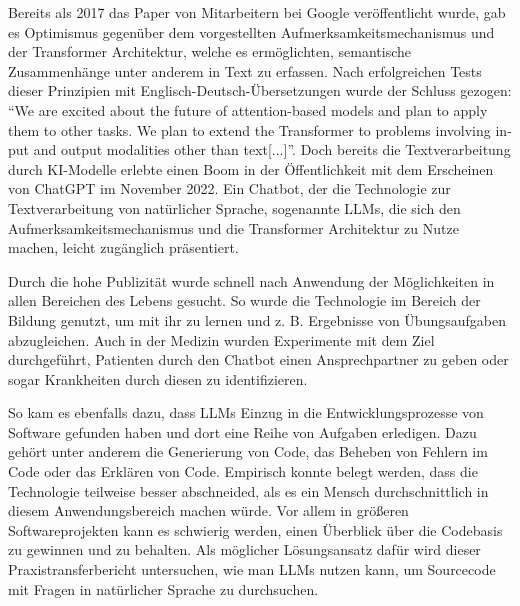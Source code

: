 \documentclass[../main.tex]{subfiles}
\begin{document}
Bereits als 2017 das Paper  von Mitarbeitern bei Google veröffentlicht wurde, gab es Optimismus gegenüber dem vorgestellten Aufmerksamkeitsmechanismus und der Transformer Architektur, welche es ermöglichten, semantische Zusammenhänge unter anderem in Text zu erfassen.
Nach erfolgreichen Tests dieser Prinzipien mit Englisch-Deutsch-Übersetzungen wurde der Schluss gezogen: \foreignquote{english}{We are excited about the future of attention-based models and plan to apply them to other tasks. We plan to extend the Transformer to problems involving input and output modalities other than text[...]}\cite*{vaswani2017attention}.
Doch bereits die Textverarbeitung durch \gls{KI}-Modelle erlebte einen Boom in der Öffentlichkeit mit dem Erscheinen von ChatGPT im November 2022.
Ein Chatbot, der die Technologie zur Textverarbeitung von natürlicher Sprache, sogenannte \glspl{LLM}, die sich den Aufmerksamkeitsmechanismus und die Transformer Architektur zu Nutze machen, leicht zugänglich präsentiert. \cite{chatgpt2023}

Durch die hohe Publizität wurde schnell nach Anwendung der Möglichkeiten in allen Bereichen des Lebens gesucht.
So wurde die Technologie im Bereich der Bildung genutzt, um mit ihr zu lernen und z. B. Ergebnisse von Übungsaufgaben abzugleichen.
Auch in der Medizin wurden Experimente mit dem Ziel durchgeführt, Patienten durch den Chatbot einen Ansprechpartner zu geben oder sogar Krankheiten durch diesen zu identifizieren.
\cite*{liu2023summary}

So kam es ebenfalls dazu, dass \glspl{LLM} Einzug in die Entwicklungsprozesse von Software gefunden haben und dort eine Reihe von Aufgaben erledigen.
Dazu gehört unter anderem die Generierung von Code, das Beheben von Fehlern im Code oder das Erklären von Code.
Empirisch konnte belegt werden, dass die Technologie teilweise besser abschneided, als es ein Mensch durchschnittlich in diesem Anwendungsbereich machen würde\cite*{tian2023chatgpt}.
Vor allem in größeren Softwareprojekten kann es schwierig werden, einen Überblick über die Codebasis zu gewinnen und zu behalten.
Als möglicher Lösungsansatz dafür wird dieser Praxistransferbericht untersuchen, wie man \glspl{LLM} nutzen kann, um Sourcecode mit Fragen in natürlicher Sprache zu durchsuchen.
\end{document}
